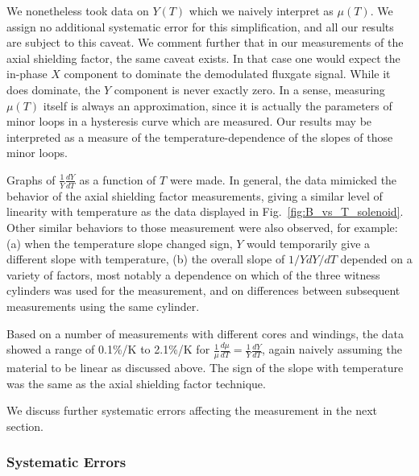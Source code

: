 We nonetheless took data on $Y(T)$ which we naively interpret as
$\mu(T)$.  We assign no additional systematic error for this
simplification, and all our results are subject to this caveat.  We
comment further that in our measurements of the axial shielding
factor, the same caveat exists.  In that case one would expect the
in-phase $X$ component to dominate the demodulated fluxgate signal.
While it does dominate, the $Y$ component is never exactly zero.  In a
sense, measuring $\mu(T)$ itself is always an approximation, since it
is actually the parameters of minor loops in a hysteresis curve which
are measured.  Our results may be interpreted as a measure of the
temperature-dependence of the slopes of those minor loops.

Graphs of $\frac{1}{Y}\frac{dY}{dT}$ as a function of $T$ were made.
In general, the data mimicked the behavior of the axial shielding
factor measurements, giving a similar level of linearity with
temperature as the data displayed in
Fig.~\ref{fig:B_vs_T_solenoid}.  Other similar behaviors to
those measurement were also observed, for example: (a) when the
temperature slope changed sign, $Y$ would temporarily give a different
slope with temperature, (b) the overall slope of $1/Y dY/dT$ depended
on a variety of factors, most notably a dependence on which of the
three witness cylinders was used for the measurement, and on
differences between subsequent measurements using the same cylinder.

Based on a number of measurements with different cores and windings,
the data showed a range of 0.1\%/K to 2.1\%/K for
$\frac{1}{\mu}\frac{d\mu}{dT}=\frac{1}{Y}\frac{dY}{dT}$, again naively
assuming the material to be linear as discussed above.  The sign of
the slope with temperature was the same as the axial shielding factor
technique.

We discuss further systematic errors affecting the measurement in the
next section.

\subsubsection{Systematic Errors \label{sec:tarnsformersystematics}}


